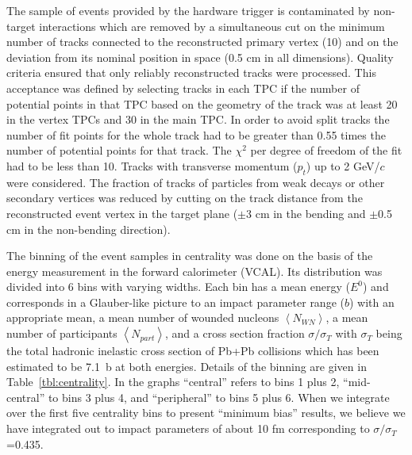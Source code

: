 \documentclass[aps,prc,superscriptaddress,showpacs,floatfix,nofootinbib]{revtex4}
\newcommand{\mean}[1]{\left\langle #1 \right\rangle}
\begin{document}
The sample of events provided by the hardware trigger is contaminated
by non-target interactions which are removed by a simultaneous cut on
the minimum number of tracks connected to the reconstructed primary
vertex (10) and on the deviation from its nominal position in space
(0.5 cm in all dimensions).  Quality criteria ensured that only
reliably reconstructed tracks were processed. This acceptance was
defined by selecting tracks in each TPC if the number of potential
points in that TPC based on the geometry of the track was at least 20
in the vertex TPCs and 30 in the main TPC. In order to avoid split
tracks the number of fit points for the whole track had to be greater
than 0.55 times the number of potential points for that track. The 
$\chi^2$ per degree of freedom of the fit had to be less than 10. 
Tracks with transverse momentum ($p_t$) up to 2 GeV/$c$ were considered.
The fraction of tracks of particles from weak decays or other secondary
vertices was reduced by cutting on the track distance from the
reconstructed event vertex in the target plane ($\pm$3 cm in the
bending and $\pm$0.5 cm in the non-bending direction).

The binning of the event samples in centrality was done on the basis
of the energy measurement in the forward calorimeter (VCAL). Its
distribution was divided into 6 bins with varying widths. Each bin has
a mean energy ($E^0$) and corresponds in a Glauber-like picture to an
impact parameter range ($b$) with an appropriate mean, a mean number
of wounded nucleons $\mean{N_{WN}}$, a mean number of participants
$\mean{N_{part}}$, and a cross section fraction $\sigma/\sigma_T$ with
$\sigma_T$ being the total hadronic inelastic cross section of Pb+Pb
collisions which has been estimated to be 7.1~b at both
energies. Details of the binning are given in
Table~\ref{tbl:centrality}. In the graphs ``central'' refers to bins 1
plus 2, ``mid-central'' to bins 3 plus 4, and ``peripheral'' to bins 5
plus 6. When we integrate over the first five centrality bins to
present ``minimum bias'' results, we believe we have integrated out to
impact parameters of about 10 fm corresponding to
$\sigma/\sigma_T$=0.435.
\end{document}
